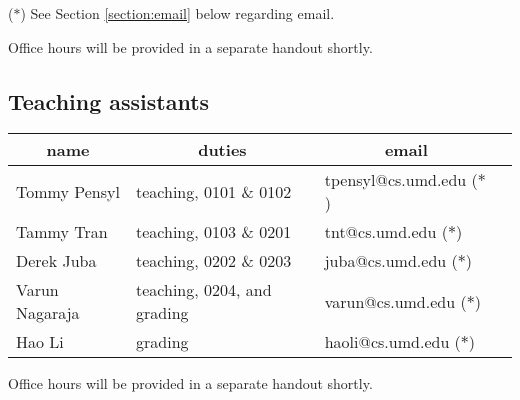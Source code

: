 \documentclass[10pt]{article}
\begin{document}
      \smallskip

      ($*$) See Section \ref{section:email} below regarding email.

      Office hours will be provided in a separate handout shortly.

    \subsection{Teaching assistants}

      \vspace{-1mm}

      \begin{center}

        \renewcommand{\arraystretch}{1.1}

        \hspace{5.5mm}%
        \begin{tabular}{@{}|l|l|l|l|@{}}

          \multicolumn{1}{c}{name}
            & \multicolumn{1}{c}{duties}
            & \multicolumn{1}{c}{email}
            \\ \hline

          Tommy Pensyl
            & teaching, 0101 \& 0102
            & tpensyl@cs.umd.edu ($*$)
            \\ \hline

          Tammy Tran
            & teaching, 0103 \& 0201
            & tnt@cs.umd.edu ($*$)
            \\ \hline

          Derek Juba
            & teaching, 0202 \& 0203
            & juba@cs.umd.edu ($*$)
            \\ \hline

          Varun Nagaraja
            & teaching, 0204, and grading
            & varun@cs.umd.edu ($*$)
            \\ \hline

          Hao Li
            & grading
            & haoli@cs.umd.edu ($*$)
            \\ \hline

        \end{tabular}

      \end{center}

      \smallskip

      Office hours will be provided in a separate handout shortly.

      \smallskip
\end{document}
